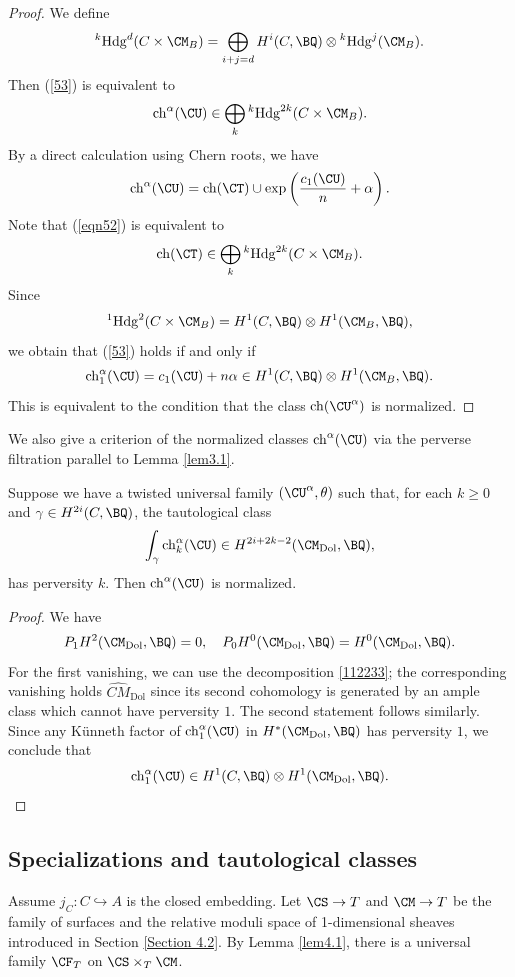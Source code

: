 \begin{proof}
We define
\[
{^k\mathrm{Hdg}^{d}(C\times \CM_B)} = \bigoplus_{i+j=d} H^i(C, \BQ) \otimes {^k\mathrm{Hdg}^{j}(\CM_B)}.
\]
Then (\ref{53}) is equivalent to
\[
\mathrm{ch}^\alpha(\CU) \in \bigoplus_k {^k\mathrm{Hdg}^{2k}(C\times \CM_B)}.
\]
By a direct calculation using Chern roots, we have
\[
\mathrm{ch}^\alpha(\CU) = \mathrm{ch}(\CT) \cup \mathrm{exp}\left(\frac{c_1(\CU)}{n}+ \alpha\right).
\]
Note that (\ref{eqn52}) is equivalent to \[
\mathrm{ch}(\CT) \in \bigoplus_k {^k\mathrm{Hdg}^{2k}(C\times \CM_B)}.
\]
Since
\[
{^1\mathrm{Hdg}^{2}(C\times \CM_B)} = H^1(C, \BQ)\otimes H^1(\CM_B ,\BQ),
\]
we obtain that (\ref{53}) holds if and only if
\[
\mathrm{ch}_1^\alpha(\CU)= c_1(\CU) + n\alpha \in H^1(C, \BQ) \otimes H^1(\CM_B, \BQ).
\]
This is equivalent to the condition that the class $\mathrm{ch}(\CU^\alpha)$ is normalized.
\end{proof}

We also give a criterion of the normalized classes $\mathrm{ch}^\alpha(\CU)$ via the perverse filtration parallel to Lemma \ref{lem3.1}.

\begin{lem}
\notready\label{lem4.7}
Suppose we have a twisted universal family $(\CU^\alpha, \theta)$ such that, for each $k \geq 0$ and $\gamma \in H^{2i}(C, \BQ)$, the tautological class
\begin{equation*}
\int_\gamma \mathrm{ch}^\alpha_k(\CU) \in H^{2i+2k-2}(\CM_\mathrm{Dol}, \BQ),
\end{equation*}
has perversity $k$. Then $\mathrm{ch}^\alpha(\CU)$ is normalized.
\end{lem}

\begin{proof}
We have
\[
 P_1H^2(\CM_{\mathrm{Dol}}, \BQ) = 0, \quad  P_0H^0(\CM_{\mathrm{Dol}}, \BQ)=H^0(\CM_{\mathrm{Dol}}, \BQ).
\]
For the first vanishing, we can use the decomposition \eqref{112233}; the corresponding vanishing holds $\widehat{CM}_{\mathrm{Dol}}$ since its second cohomology is generated by an ample class which cannot have perversity $1$.  The second statement follows similarly.
Since any K\"unneth factor of $\mathrm{ch}_1^\alpha(\CU)$ in $H^*(\CM_{\mathrm{Dol}}, \BQ)$ has perversity $1$, we conclude that
\[
\mathrm{ch}_1^\alpha(\CU) \in  H^1(C, \BQ)\otimes H^1(\CM_\mathrm{Dol} ,\BQ). \qedhere
\]
\end{proof}

\subsection{Specializations and tautological classes}
Assume $j_C: C\hookrightarrow A$ is the closed embedding. Let $\CS \to T$ and $\CM \to T$ be the family of surfaces and the relative moduli space of 1-dimensional sheaves introduced in Section \ref{Section 4.2}. By Lemma \ref{lem4.1}, there is a universal family $\CF_T$ on $\CS\times_T \CM$.

